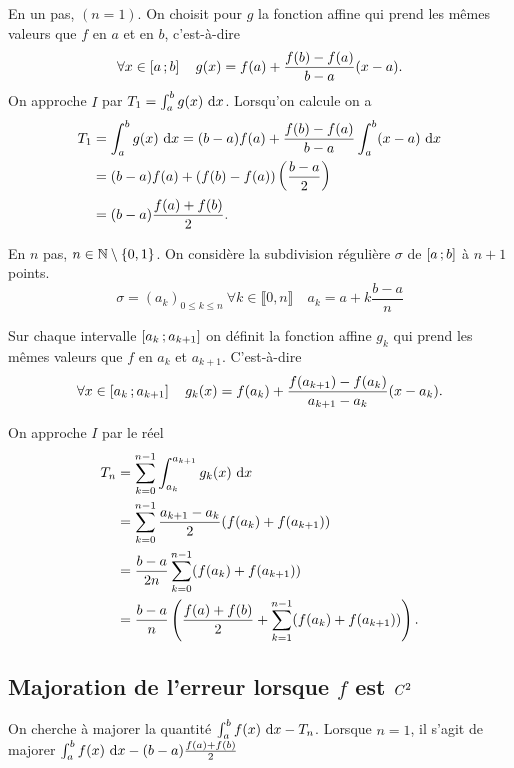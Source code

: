En un pas, $(n=1)$. On choisit pour $g$ la fonction affine qui prend les mêmes valeurs que $f$ en $a$ et en $b$, c'est-à-dire
\begin{equation}
  \forall x \in \left[ a \, ;  b \right] \quad g(x) = f(a) +\frac{f(b)-f(a)}{b-a}(x-a).
\end{equation}
On approche $I$ par $T_1=\int_a^bg(x)\,\mathop{}\mathopen{}\mathrm{d} x$. Lorsqu'on calcule on a
\begin{align}
  T_1&=\int_a^bg(x)\,\mathop{}\mathopen{}\mathrm{d} x = (b-a)f(a) + \frac{f(b)-f(a)}{b-a} \int_a^b (x-a)\,\mathop{}\mathopen{}\mathrm{d} x \\
  &=(b-a)f(a) + (f(b)-f(a))\left(\frac{b-a}{2}\right)\\
  &=(b-a) \frac{f(a)+f(b)}{2}.
\end{align}

En $n$ pas, $n \in \mathbb{N}\setminus\{0,1\}$. On considère la subdivision régulière $\sigma$ de $\left[ a \, ;  b \right]$ à $n+1$ points.
\begin{equation}
  \sigma = (a_k)_{0 \leq k \leq n} \ \forall k \in \llbracket 0,n \rrbracket \quad a_k = a+ k \frac{b-a}{n}
\end{equation}

Sur chaque intervalle $\left[ a_k \, ;  a_{k+1} \right]$ on définit la fonction affine $g_k$ qui prend les mêmes valeurs que $f$ en $a_k$ et $a_{k+1}$. C'est-à-dire
\begin{equation}
  \forall x \in \left[ a_k \, ;  a_{k+1} \right] \quad g_k(x) = f(a_k) + \frac{f(a_{k+1})-f(a_k)}{a_{k+1}-a_k}(x-a_{k}).
\end{equation}

On approche $I$ par le réel
\begin{align}
  T_n &= \sum_{k=0}^{n-1} \int_{a_k}^{a_{k+1}} g_k(x)\,\mathop{}\mathopen{}\mathrm{d} x \\
  &= \sum_{k=0}^{n-1} \frac{a_{k+1}-a_k}{2}(f(a_k)+f(a_{k+1}))\\
  &=\frac{b-a}{2n}  \sum_{k=0}^{n-1}(f(a_k)+f(a_{k+1})) \\
  &=\frac{b-a}{n} \left(\frac{f(a)+f(b)}{2} + \sum_{k=1}^{n-1}(f(a_k)+f(a_{k+1})) \right).
\end{align}

\subsection{Majoration de l'erreur lorsque $f$ est $\mathit{C}^2$}

On cherche à majorer la quantité $\int_a^bf(x)\,\mathop{}\mathopen{}\mathrm{d} x -T_n$. Lorsque $n=1$, il s'agit de majorer $\int_a^bf(x)\,\mathop{}\mathopen{}\mathrm{d} x - (b-a)\frac{f(a)+f(b)}{2}$

